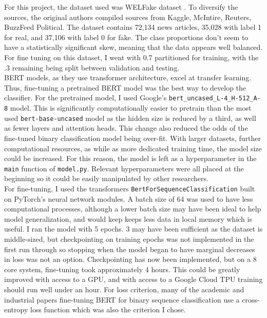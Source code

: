 \documentclass[12pt]{article}
\begin{document}
For this project, the dataset used was WELFake dataset \cite{9395133}. To diversify the sources, the original authors compiled sources from Kaggle, McIntire, Reuters, BuzzFeed Political. The dataset contains 72,134 news articles, 35,028 with label 1 for real, and 37,106 with label 0 for fake. The class proportions don't seem to have a statistically significant skew, meaning that the data appears well balanced. For fine tuning on this dataset, I went with 0.7 partitioned for training, with the .3 remaining being split between validation and testing. \\

BERT models, as they use transformer architecture, excel at transfer learning. Thus, fine-tuning a pretrained BERT model was the best way to develop the classifier. For the pretrained model, I used Google's \verb|bert_uncased_L-4_H-512_A-8| model. This is significantly computationally easier to pretrain than the most used \verb|bert-base-uncased| model as the hidden size is reduced by a third, as well as fewer layers and attention heads. This change also reduced the odds of the fine-tuned binary classification model being over-fit. With larger datasets, further computational resources, as while as more dedicated training time, the model size could be increased. For this reason, the model is left as a hyperparameter in the \verb|main| function of \verb|model.py|. Relevant hyperparameters were all placed at the beginning so it could be easily manipulated by other researchers.\\

For fine-tuning, I used the transformers \verb|BertForSequenceClassification| built on PyTorch's neural network modules. A batch size of 64 was used to have less computational processes, although a lower batch size may have been ideal to help model generalization, and would keep keeps less data in local memory which is useful. I ran the model with 5 epochs. 3 may have been sufficient as the dataset is middle-sized, but checkpointing on training epochs was not implemented in the first run through so stopping when the model began to have marginal decreases in loss was not an option. \cite{devlin2019bert} Checkpointing has now been implemented, but on a 8 core system, fine-tuning took approximately 4 hours. This could be greatly improved with access to a GPU, and with access to a Google Cloud TPU training should run well under an hour. For loss criterion, many of the academic and industrial papers fine-tuning BERT for binary sequence classification use a cross-entropy loss function which was also the criterion I chose. \\
\end{document}

